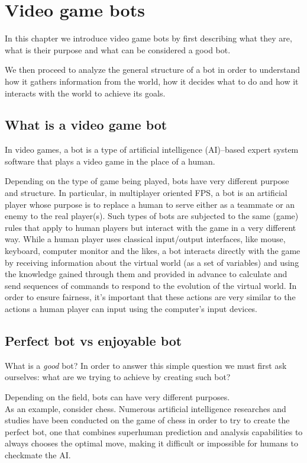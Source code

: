 \chapter{Video game bots}
In this chapter we introduce video game bots by first describing what they are, what is their purpose and what can be considered a good bot.

We then proceed to analyze the general structure of a bot in order to understand how it gathers information from the world, how it decides what to do and how it interacts with the world to achieve its goals.

\section{What is a video game bot}
In video games, a bot is a type of artificial intelligence (AI)–based expert system software that plays a video game in the place of a human. 

Depending on the type of game being played, bots have very different purpose and structure. In particular, in multiplayer oriented FPS, a bot is an artificial player whose purpose is to replace a human to serve either as a teammate or an enemy to the real player(s). Such types of bots are subjected to the same (game) rules that apply to human players but interact with the game in a very different way. While a human player uses classical input/output interfaces, like mouse, keyboard, computer monitor and the likes, a bot interacts directly with the game by receiving information about the virtual world (as a set of variables) and using the knowledge gained through them and provided in advance to calculate and send sequences of commands to respond to the evolution of the virtual world. In order to ensure fairness, it's important that these actions are very similar to the actions a human player can input using the computer’s input devices.

\section{Perfect bot vs enjoyable bot}
What is a \textit{good} bot?  In order to answer this simple question we must first ask ourselves: what are we trying to achieve by creating such bot?

Depending on the field, bots can have very different purposes. \\
As an example, consider chess. Numerous artificial intelligence researches and studies have been conducted on the game of chess in order to try to create the perfect bot, one that combines superhuman prediction and analysis capabilities to always chooses the optimal move, making it difficult or impossible for humans to checkmate the AI.

